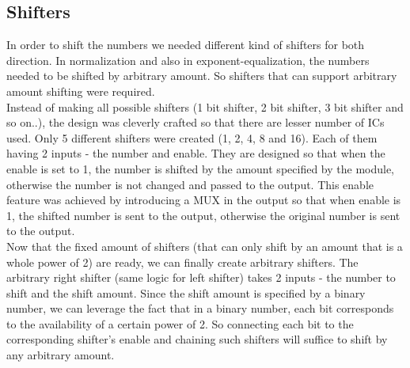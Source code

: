 \documentclass{article}
\begin{document}
\subsection{\textbf{Shifters}}
In order to shift the numbers we needed different kind of shifters for both direction. In normalization and also in exponent-equalization, the numbers needed to
be shifted by arbitrary amount. So shifters that can support arbitrary amount
shifting were required.
\\ 

Instead of making all possible shifters (1 bit shifter, 2 bit shifter, 3 bit shifter
and so on..), the design was cleverly crafted so that there are lesser number of
ICs used. Only 5 different shifters were created (1, 2, 4, 8 and 16). Each of them
having 2 inputs - the number and enable. They are designed so that when the
enable is set to 1, the number is shifted by the amount specified by the module,
otherwise the number is not changed and passed to the output. This enable
feature was achieved by introducing a MUX in the output so that when enable
is 1, the shifted number is sent to the output, otherwise the original number is
sent to the output.
\\ 

Now that the fixed amount of shifters (that can only shift by an amount that
is a whole power of 2) are ready, we can finally create arbitrary shifters. The
arbitrary right shifter (same logic for left shifter) takes 2 inputs - the number
to shift and the shift amount. Since the shift amount is specified by a binary
number, we can leverage the fact that in a binary number, each bit corresponds
to the availability of a certain power of 2. So connecting each bit to the corresponding shifter’s enable and chaining such shifters will suffice to shift by any
arbitrary amount. 
\end{document}
